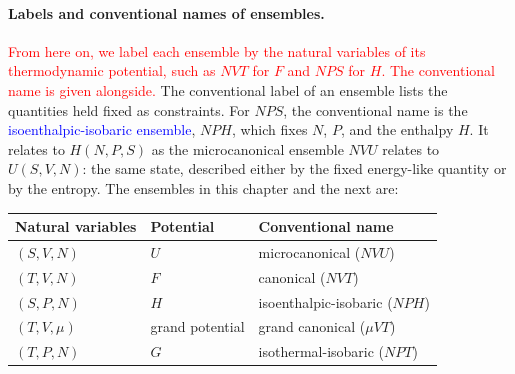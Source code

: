 \paragraph{Labels and conventional names of ensembles.}
\textcolor{red}{From here on, we label each ensemble by the natural variables
of its thermodynamic potential, such as $NVT$ for $F$ and $NPS$ for $H$.
The conventional name is given alongside.}
The conventional label of an ensemble lists the quantities held fixed as
constraints. For $NPS$, the conventional name is the
\textcolor{blue}{isoenthalpic-isobaric ensemble}, $NPH$, which fixes $N$,
$P$, and the enthalpy $H$. It relates to $H(N,P,S)$ as the microcanonical
ensemble $NVU$ relates to $U(S,V,N)$: the same state, described either by the
fixed energy-like quantity or by the entropy. The ensembles in this chapter
and the next are:
\begin{center}
\begin{tabular}{lll}
    Natural variables & Potential & Conventional name \\ \hline
    $(S,V,N)$ & $U$ & microcanonical ($NVU$) \\
    $(T,V,N)$ & $F$ & canonical ($NVT$) \\
    $(S,P,N)$ & $H$ & isoenthalpic-isobaric ($NPH$) \\
    $(T,V,\mu)$ & grand potential & grand canonical ($\mu VT$) \\
    $(T,P,N)$ & $G$ & isothermal-isobaric ($NPT$) \\
\end{tabular}
\end{center}
